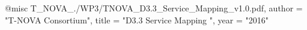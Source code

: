 @misc{ T_NOVA_./WP3/TNOVA_D3.3_Service_Mapping_v1.0.pdf,
       author = "T-NOVA Consortium",
       title = "D3.3 Service Mapping ",
       year = "2016" }

